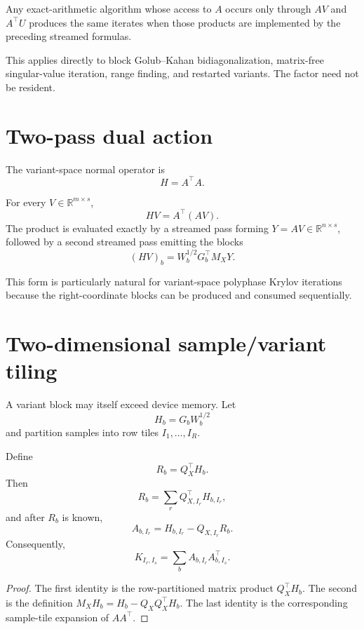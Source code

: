 \begin{corollary}\label{claim:final-10-3}
Any exact-arithmetic algorithm whose access to \(A\) occurs only through
\(AV\) and \(A^\top U\) produces the same iterates when those products are
implemented by the preceding streamed formulas.
\end{corollary}

This applies directly to block Golub--Kahan bidiagonalization, matrix-free
singular-value iteration, range finding, and restarted variants.  The
factor need not be resident.


\section{Two-pass dual action}\label{sec:final-11}

The variant-space normal operator is
\[
H=A^\top A.
\]

\begin{theorem}\label{claim:final-11-1}
For every \(V\in\mathbb R^{m\times s}\),
\[
\boxed{
HV=A^\top(AV).
}
\]
The product is evaluated exactly by a streamed pass forming
\(Y=AV\in\mathbb R^{n\times s}\), followed by a second streamed pass
emitting the blocks
\[
(HV)_b=W_b^{1/2}G_b^\top M_XY.
\]
\end{theorem}

This form is particularly natural for variant-space polyphase Krylov
iterations because the right-coordinate blocks can be produced and consumed
sequentially.


\section{Two-dimensional sample/variant tiling}\label{sec:final-12}

A variant block may itself exceed device memory.  Let
\[
H_b=G_bW_b^{1/2}
\]
and partition samples into row tiles \(I_1,\ldots,I_R\).

\begin{theorem}\label{claim:final-12-1}
Define
\[
R_b=Q_X^\top H_b.
\]
Then
\[
\boxed{
R_b
=
\sum_r
Q_{X,I_r}^\top H_{b,I_r},
}
\]
and after \(R_b\) is known,
\[
\boxed{
A_{b,I_r}
=
H_{b,I_r}-Q_{X,I_r}R_b.
}
\]
Consequently,
\[
\boxed{
K_{I_r,I_s}
=
\sum_b
A_{b,I_r}A_{b,I_s}^\top.
}
\]
\end{theorem}

\begin{proof}
The first identity is the row-partitioned matrix product
\(Q_X^\top H_b\).  The second is the definition
\(M_XH_b=H_b-Q_XQ_X^\top H_b\).  The last identity is the corresponding
sample-tile expansion of \(AA^\top\).
\end{proof}

